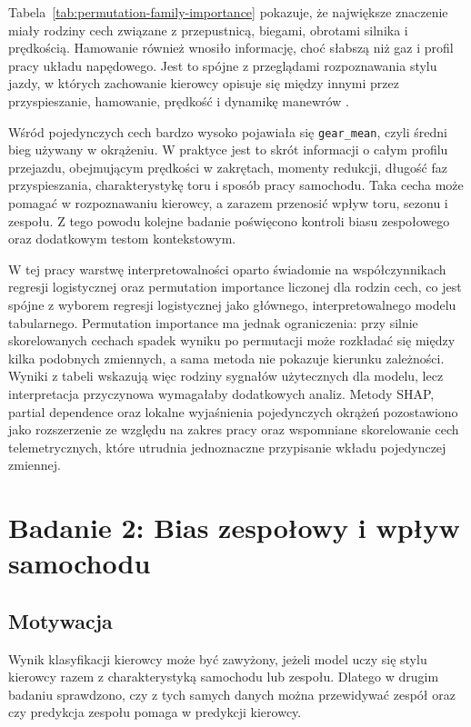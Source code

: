 \documentclass[printmode,pl]{mgr}
\begin{document}
Tabela~\ref{tab:permutation-family-importance} pokazuje, że największe znaczenie miały rodziny cech związane z przepustnicą, biegami, obrotami silnika i prędkością. Hamowanie również wnosiło informację, choć słabszą niż gaz i profil pracy układu napędowego. Jest to spójne z przeglądami rozpoznawania stylu jazdy, w których zachowanie kierowcy opisuje się między innymi przez przyspieszanie, hamowanie, prędkość i dynamikę manewrów \cite{driving_style_review}.

Wśród pojedynczych cech bardzo wysoko pojawiała się \texttt{gear\_mean}, czyli średni bieg używany w okrążeniu. W praktyce jest to skrót informacji o całym profilu przejazdu, obejmującym prędkości w zakrętach, momenty redukcji, długość faz przyspieszania, charakterystykę toru i sposób pracy samochodu. Taka cecha może pomagać w rozpoznawaniu kierowcy, a zarazem przenosić wpływ toru, sezonu i zespołu. Z tego powodu kolejne badanie poświęcono kontroli biasu zespołowego oraz dodatkowym testom kontekstowym.

W tej pracy warstwę interpretowalności oparto świadomie na współczynnikach regresji logistycznej oraz permutation importance liczonej dla rodzin cech, co jest spójne z wyborem regresji logistycznej jako głównego, interpretowalnego modelu tabularnego. Permutation importance ma jednak ograniczenia: przy silnie skorelowanych cechach spadek wyniku po permutacji może rozkładać się między kilka podobnych zmiennych, a sama metoda nie pokazuje kierunku zależności. Wyniki z tabeli wskazują więc rodziny sygnałów użytecznych dla modelu, lecz interpretacja przyczynowa wymagałaby dodatkowych analiz. Metody SHAP, partial dependence oraz lokalne wyjaśnienia pojedynczych okrążeń pozostawiono jako rozszerzenie ze względu na zakres pracy oraz wspomniane skorelowanie cech telemetrycznych, które utrudnia jednoznaczne przypisanie wkładu pojedynczej zmiennej.

\chapter{Badanie 2: Bias zespołowy i wpływ samochodu}

\section{Motywacja}

Wynik klasyfikacji kierowcy może być zawyżony, jeżeli model uczy się stylu kierowcy razem z charakterystyką samochodu lub zespołu. Dlatego w drugim badaniu sprawdzono, czy z tych samych danych można przewidywać zespół oraz czy predykcja zespołu pomaga w predykcji kierowcy.
\end{document}
